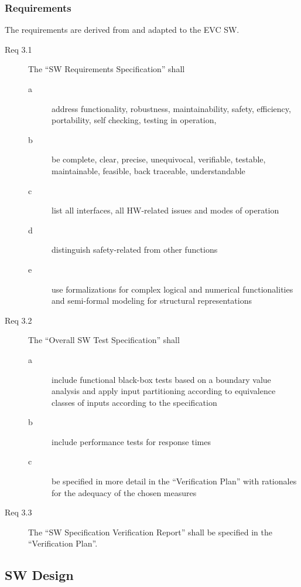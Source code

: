 \documentclass{template/openetcs_article}
\begin{document}
\subsubsection{Requirements}
\label{sec:3-requirements}


The requirements are derived from \cite[Sec.~7.2.4]{EN50128:2011}
and adapted to the EVC SW.
\begin{description}
\item[Req 3.1] The ``SW Requirements Specification'' shall 
  \begin{description}
  \item[a] address functionality, robustness, maintainability, safety,
    efficiency, portability, self checking, testing in operation, 
  \item[b] be complete, clear, precise, unequivocal, verifiable,
    testable, maintainable, feasible, back traceable, understandable
  \item[c] list all interfaces, all HW-related issues and modes of
    operation 
  \item[d] distinguish safety-related from other functions
  \item[e] use formalizations for complex logical and numerical
    functionalities and semi-formal modeling for structural representations  
  \end{description}
\item[Req 3.2] The ``Overall SW Test Specification'' shall
  \begin{description}
  \item[a] include functional black-box tests based on a boundary value
    analysis and apply input partitioning according to equivalence
    classes of inputs according to the specification
  \item[b] include performance tests for response times
  \item[c] be specified in more detail in the ``Verification Plan''
    with rationales for the adequacy of the chosen measures
  \end{description}
\item[Req 3.3] The ``SW Specification Verification Report'' shall be
  specified in the ``Verification Plan''.
\end{description}


\subsection{SW Design}
\label{sec:softw-arch-desi-phase}
\end{document}
